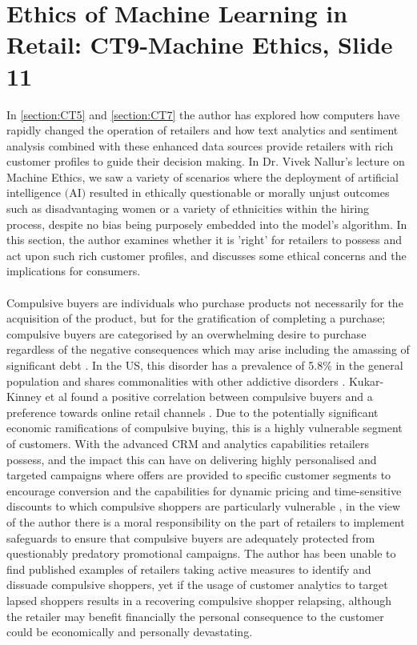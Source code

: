 \documentclass[11pt]{article}
\theoremstyle{plain}
\theoremstyle{definition}
\begin{document}
\section{Ethics of Machine Learning in Retail: CT9-Machine Ethics, Slide 11}\label{section:CT9}
In \ref{section:CT5} and \ref{section:CT7} the author has explored how computers have rapidly changed the operation of retailers and how text analytics and sentiment analysis combined with these enhanced data sources provide retailers with rich customer profiles to guide their decision making. In Dr. Vivek Nallur's lecture on Machine Ethics, we saw a variety of scenarios where the deployment of artificial intelligence $($AI$)$ resulted in ethically questionable or morally unjust outcomes such as disadvantaging women or a variety of ethnicities within the hiring process, despite no bias being purposely embedded into the model's algorithm\cite{CT9}. In this section, the author examines whether it is 'right' for retailers to possess and act upon such rich customer profiles, and discusses some ethical concerns and the implications for consumers.\\
\\
Compulsive buyers are individuals who purchase products not necessarily for the acquisition of the product, but for the gratification of completing a purchase; compulsive buyers are categorised by an overwhelming desire to purchase regardless of the negative consequences which may arise including the amassing of significant debt \cite{10.1086/209204}. In the US, this disorder has a prevalence of 5.8\% in the general population \cite{Black:2007aa} and shares commonalities with other addictive disorders \cite{krych1989abnormal}. Kukar-Kinney et al found a positive correlation between compulsive buyers and a preference towards online retail channels \cite{Kukar-Kinney:2009aa}. Due to the potentially significant economic ramifications of compulsive buying, this is a highly vulnerable segment of customers. With the advanced CRM and analytics capabilities retailers possess, and the impact this can have on delivering highly personalised and targeted campaigns where offers are provided to specific customer segments to encourage conversion \cite{Rossi:1996aa} and the capabilities for dynamic pricing \cite{https://doi.org/10.1002/nav.20204} and time-sensitive discounts to which compulsive shoppers are particularly vulnerable \cite{KUKARKINNEY2016691}, in the view of the author there is a moral responsibility on the part of retailers to implement safeguards to ensure that compulsive buyers are adequately protected from questionably predatory promotional campaigns. The author has been unable to find published examples of retailers taking active measures to identify and dissuade compulsive shoppers, yet if the usage of customer analytics to target lapsed shoppers results in a recovering compulsive shopper relapsing, although the retailer may benefit financially the personal consequence to the customer could be economically and personally devastating.\\
\end{document}
